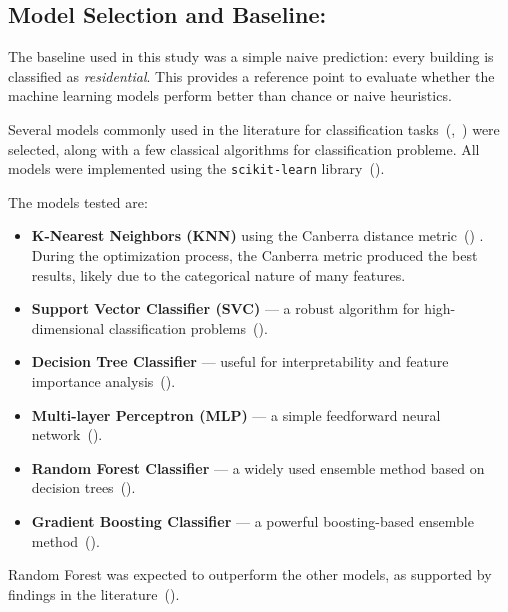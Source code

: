 \documentclass[11pt]{article}
\begin{document}
\subsection[\appendixname~\thesubsection]{Model Selection and Baseline:}


The baseline used in this study was a simple naive prediction: every building is classified as \textit{residential}. This provides a reference point to evaluate whether the machine learning models perform better than chance or naive heuristics.


Several models commonly used in the literature for classification tasks~(\cite{wurm2015},~\cite{lloyd2020}) were selected, along with a few classical algorithms for classification probleme. All models were implemented using the \texttt{scikit-learn} library~(\cite{scikit-learn}).


The models tested are:

\begin{itemize}
    \item \textbf{K-Nearest Neighbors (KNN)} using the Canberra distance metric~(\cite{lance1967canberra}) . During the optimization process, the Canberra metric produced the best results, likely due to the categorical nature of many features.

    
    \item \textbf{Support Vector Classifier (SVC)} — a robust algorithm for high-dimensional classification problems~(\cite{cortes1995svm}).

    \item \textbf{Decision Tree Classifier} — useful for interpretability and feature importance analysis~(\cite{quinlan1986id3}).

    
    \item \textbf{Multi-layer Perceptron (MLP)} — a simple feedforward neural network~(\cite{rumelhart1986mlp}).



    \item \textbf{Random Forest Classifier} — a widely used ensemble method based on decision trees~(\cite{breiman2001randomforest}).

    
    \item \textbf{Gradient Boosting Classifier} — a powerful boosting-based ensemble method~(\cite{friedman2001gradient}).

\end{itemize}

Random Forest was expected to outperform the other models, as supported by findings in the literature~(\cite{lloyd2020}).
\end{document}
